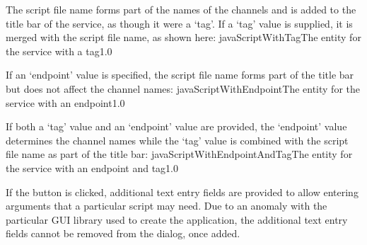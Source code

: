 The script file name forms part of the names of the channels and is added to the title bar
of the service, as though it were a `tag'.
\condPage{}
If a `tag' value is supplied, it is merged with the script file name, as shown here:
%
{javaScriptWithTag}{The \emph{\MMMU} entity for the \emph{\JSF} service with a tag}{1.0}

If an `endpoint' value is specified, the script file name forms part of the title bar but
does not affect the channel names:
%
{javaScriptWithEndpoint}{The \emph{\MMMU} entity for the \emph{\JSF} service with an
endpoint}{1.0}

If both a `tag' value and an `endpoint' value are provided, the `endpoint' value
determines the channel names while the `tag' value is combined with the script file name
as part of the title bar:
%
{javaScriptWithEndpointAndTag}{The \emph{\MMMU} entity for the \emph{\JSF} service with an
endpoint and tag}{1.0}

If the  button is clicked, additional text entry fields are
provided to allow entering arguments that a particular script may need.
\openSq{}Due to an anomaly with the particular GUI library used to create the
\emph{\MMMU} application, the additional text entry fields cannot be removed from the
dialog, once added.\closeSq{}
\secondaryEnd
\primaryEnd{}

